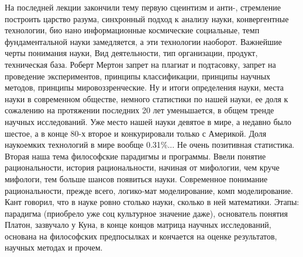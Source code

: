 \documentclass[a4paper, 12pt]{article}
\begin{document}
На последней лекции закончили тему первую сцеинтизм и анти-, стремление 
построить царство разума, синхронный подход к анализу науки, 
конвергентные технологии, био нано информационные космические 
социальные, темп фундаментальной науки замедляется, а эти технологии 
наоборот. Важнейшие черты понимания науки, Вид деятельности, тип 
организации, продукт, техническая база. Роберт Мертон запрет на плагиат 
и подтасовку, запрет на проведение экспериментов, принципы 
классификации, принципы научных методов, принципы мировоззренческие. Ну 
и итоги определения науки, места науки в современном обществе, немного 
статистики по нашей науки, ее доля к сожалению на протяжении последних 
20 лет уменьшается, в общем тренде научных исследований. Уже место нашей 
науки девятое в мире, а недавно было шестое, а в конце 80-х второе 
и конкурировали только с Америкой. Доля наукоемких технологий в мире 
вообще 0.31\%... Не очень позитивная статистика. Вторая наша тема 
философские парадигмы и программы. Ввели понятие рациональности, 
история рациональности, начиная от мифологии, чем круче мифологи, тем 
больше шансов появиться науки. Современное понимание рациональности, 
прежде всего, логико-мат моделирование, комп моделирование. Кант 
говорил, что в науке ровно столько науки, сколько в ней математики. 
Этапы: парадигма (приобрело уже соц культурное значение даже), 
основатель понятия Платон, зазвучало у Куна, в конце концов матрица 
научных исследований, основана на философских предпосылках и кончается 
на оценке результатов, научных методах и прочем.
\end{document}
